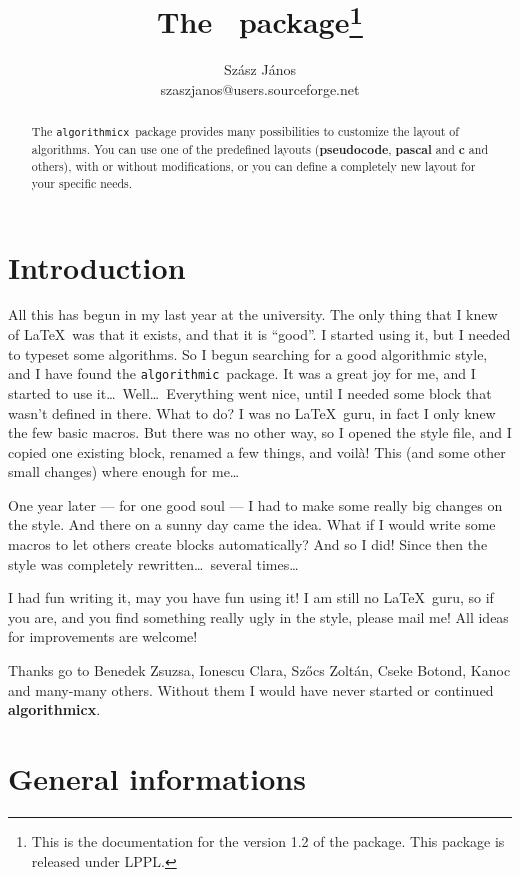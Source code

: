 \documentclass{jsarticle}
\title{The \alg\ package\footnote{This is the documentation for the version 1.2
of the package. This package is released under LPPL.}}
\author{Sz\'asz J\'anos\\szaszjanos@users.sourceforge.net}
\newcommand{\alg}{\texttt{algorithmicx}}
\newcommand{\old}{\texttt{algorithmic}}
\begin{document}
\maketitle
\begin{abstract}
The \alg\ package provides many possibilities to customize the layout of algorithms. 
You can use one of the predefined layouts (\textbf{pseudocode}, \textbf{pascal} 
and \textbf{c} and others), with or without modifications, or you can define a 
completely new layout for your specific needs.
\end{abstract}
\tableofcontents




\section{Introduction}
All this has begun in my last year at the university. The only thing that I knew of 
\LaTeX\ was that it exists, and that it is ``good''. I started using it, but I needed to typeset some 
algorithms. So I begun searching for a good algorithmic style, and I have found the \old\ package. 
It was a great joy for me, and I started to use it\dots\ 
Well\dots\ Everything went nice, until I needed some block that wasn't defined in there. What to do? 
I was no \LaTeX\ guru, in fact I only knew the few basic macros. But there was no other way, so I opened 
the style file, and I copied one existing block, renamed a few things, and voil\`a! This (and some other 
small changes) where enough for me\dots

One year later --- for one good soul --- I had to make some really big changes on the style. And there on 
a sunny day came the idea. What if I would write some macros to let others create blocks automatically? 
And so I did! Since then the style was completely rewritten\dots\ several times\dots

I had fun writing it, may you have fun using it! I am still no \LaTeX\ guru, so if you are, and you find 
something really ugly in the style, please mail me! All ideas for improvements are welcome!

Thanks go to Benedek Zsuzsa, Ionescu Clara, Sz\H ocs Zolt\'an, Cseke Botond, Kanoc 
and many-many others. Without them I would have never started or continued \textbf{algorithmicx}.




\section{General informations}
\end{document}

